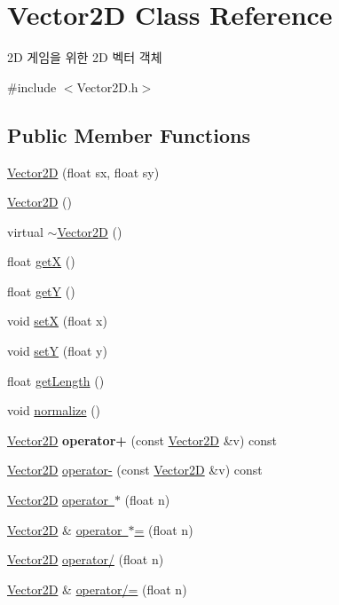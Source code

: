 \hypertarget{class_vector2_d}{}\section{Vector2D Class Reference}
\label{class_vector2_d}


2D 게임을 위한 2D 벡터 객체  




{\ttfamily \#include $<$Vector2\+D.\+h$>$}

\subsection*{Public Member Functions}
\begin{DoxyCompactItemize}
\item 
\mbox{\hyperlink{class_vector2_d_a5247181f09f861314692815978fc5f52}{Vector2D}} (float sx, float sy)
\item 
\mbox{\hyperlink{class_vector2_d_a98e9997ebb7a629f4db52397d4e0d653}{Vector2D}} ()
\item 
virtual \mbox{\hyperlink{class_vector2_d_aed227f1380bf056fd75ba9b3df7a6511}{$\sim$\+Vector2D}} ()
\item 
float \mbox{\hyperlink{class_vector2_d_a527601e47976bcfdac2520817bfee675}{getX}} ()
\item 
float \mbox{\hyperlink{class_vector2_d_a5b797fb62a3c21ced0cc8e27afd62f8b}{getY}} ()
\item 
void \mbox{\hyperlink{class_vector2_d_ac458bd997d2f0c6c7234cf1e8a7b73b8}{setX}} (float x)
\item 
void \mbox{\hyperlink{class_vector2_d_a9b47adcbdf2c10f3ba893285b5c34709}{setY}} (float y)
\item 
float \mbox{\hyperlink{class_vector2_d_a2fdc4c6d8ed4ca457381970736e9ab76}{get\+Length}} ()
\item 
void \mbox{\hyperlink{class_vector2_d_a39a3335f33d7e9850b99e4498ba4d856}{normalize}} ()
\item 
\mbox{\label{class_vector2_d_ab193c0521810f5e888874058957d6676}} 
\mbox{\hyperlink{class_vector2_d}{Vector2D}} {\bfseries operator+} (const \mbox{\hyperlink{class_vector2_d}{Vector2D}} \&v) const
\item 
\mbox{\hyperlink{class_vector2_d}{Vector2D}} \mbox{\hyperlink{class_vector2_d_a7544bf94da8fd91ca5359d98195abd9e}{operator-\/}} (const \mbox{\hyperlink{class_vector2_d}{Vector2D}} \&v) const
\item 
\mbox{\hyperlink{class_vector2_d}{Vector2D}} \mbox{\hyperlink{class_vector2_d_ab276c6f20ca36f5d2db4dcbabae1239e}{operator $\ast$}} (float n)
\item 
\mbox{\hyperlink{class_vector2_d}{Vector2D}} \& \mbox{\hyperlink{class_vector2_d_a374c8cd012b412491c1205cdd99f120b}{operator $\ast$=}} (float n)
\item 
\mbox{\hyperlink{class_vector2_d}{Vector2D}} \mbox{\hyperlink{class_vector2_d_ad52aa5d47895dc94d423d469bd0a7a87}{operator/}} (float n)
\item 
\mbox{\hyperlink{class_vector2_d}{Vector2D}} \& \mbox{\hyperlink{class_vector2_d_a4bfb85eb2041e6a04d639546f440e068}{operator/=}} (float n)
\end{DoxyCompactItemize}
